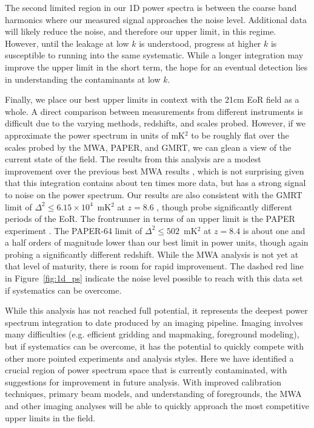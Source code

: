 \documentclass[iop]{emulateapj}
\begin{document}
The second limited region in our 1D power spectra is between the coarse band harmonics 
where our measured signal approaches the noise level. Additional data will likely reduce the 
noise, and therefore our upper limit, in this regime. However, until the leakage at low $k$ is 
understood, progress at higher $k$ is susceptible to running into the same systematic. 
While a longer integration may improve the upper limit in the short term, the hope for an 
eventual detection lies in understanding the contaminants at low $k$. 

Finally, we place our best upper limits in context with the 21cm EoR field as a whole. A 
direct comparison between measurements from different instruments is difficult due to the 
varying methods, redshifts, and scales probed. However, if we approximate the power 
spectrum in units of mK$^2$ to be roughly flat over the scales probed by the MWA, PAPER, 
and GMRT, we can glean a view of the current state of the field. The results from this 
analysis are a modest improvement over the previous best MWA results \citep{Dillon:2015}, 
which is not surprising given that this integration contains about ten times more data, but 
has a strong signal to noise on the power spectrum. Our results are also consistent with the 
GMRT limit of $\Delta^2\le6.15\times10^4$~mK$^2$ at $z=8.6$ \citep{Paciga:2013}, though 
probe significantly different periods of the EoR. The frontrunner in terms of an upper limit is 
the PAPER experiment \citep{Ali:2015, Jacobs:2015, Parsons:2014}. The PAPER-64 limit of 
$\Delta^2\le502$~mK$^2$ at $z=8.4$ is about one and a half orders of magnitude lower 
than our best limit in power units, though again probing a significantly different redshift. 
While the MWA analysis is not yet at that level of maturity, there is room for rapid 
improvement. The dashed red line in Figure~\ref{fig:1d_ps} indicate the noise level possible 
to reach with this data set if systematics can be overcome.

While this analysis has not reached full potential, it represents the deepest power spectrum 
integration to date produced by an imaging pipeline. Imaging involves many difficulties (e.g. 
efficient gridding and mapmaking, foreground modeling), but if systematics can be 
overcome, it has the potential to quickly compete with other more pointed experiments and 
analysis styles. Here we have identified a crucial region of power spectrum space that is 
currently contaminated, with suggestions for improvement in future analysis. With improved 
calibration techniques, primary beam models, and understanding of foregrounds, the MWA 
and other imaging analyses will be able to quickly approach the most competitive upper 
limits in the field.
\end{document}
